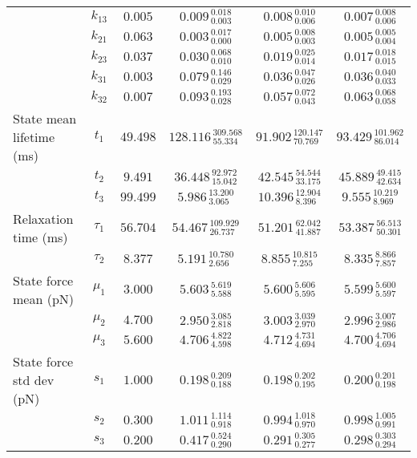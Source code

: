 \begin{table*}
\begin{tabular*}{\textwidth}{@{\extracolsep{\fill}}lccccc}
		& $k_{13}$ & $0.005$ & $0.009_{\:0.003}^{\:0.018}$ & $0.008_{\:0.006}^{\:0.010}$ & $0.007_{\:0.006}^{\:0.008}$ \\
		& $k_{21}$ & $0.063$ & $0.003_{\:0.000}^{\:0.017}$ & $0.005_{\:0.003}^{\:0.008}$ & $0.005_{\:0.004}^{\:0.005}$ \\
		& $k_{23}$ & $0.037$ & $0.030_{\:0.010}^{\:0.068}$ & $0.019_{\:0.014}^{\:0.025}$ & $0.017_{\:0.015}^{\:0.018}$ \\
		& $k_{31}$ & $0.003$ & $0.079_{\:0.029}^{\:0.146}$ & $0.036_{\:0.026}^{\:0.047}$ & $0.036_{\:0.033}^{\:0.040}$ \\
		& $k_{32}$ & $0.007$ & $0.093_{\:0.028}^{\:0.193}$ & $0.057_{\:0.043}^{\:0.072}$ & $0.063_{\:0.058}^{\:0.068}$ \\
		\hline
		State mean lifetime (ms) 		& $t_{1}$ & $49.498$ & $128.116_{\:55.334}^{\:309.568}$ & $91.902_{\:70.769}^{\:120.147}$ & $93.429_{\:86.014}^{\:101.962}$ \\
		& $t_{2}$ & $9.491$ & $36.448_{\:15.042}^{\:92.972}$ & $42.545_{\:33.175}^{\:54.544}$ & $45.889_{\:42.634}^{\:49.415}$ \\
		& $t_{3}$ & $99.499$ & $5.986_{\:3.065}^{\:13.200}$ & $10.396_{\:8.396}^{\:12.904}$ & $9.555_{\:8.969}^{\:10.219}$ \\
		\hline
		Relaxation time (ms) 		& $\tau_{1}$ & $56.704$ & $54.467_{\:26.737}^{\:109.929}$ & $51.201_{\:41.887}^{\:62.042}$ & $53.387_{\:50.301}^{\:56.513}$ \\
		& $\tau_{2}$ & $8.377$ & $5.191_{\:2.656}^{\:10.780}$ & $8.855_{\:7.255}^{\:10.815}$ & $8.335_{\:7.857}^{\:8.866}$ \\
		\hline
		\hline
		State force mean (pN) 		& $\mu_{1}$ & $3.000$ & $5.603_{\:5.588}^{\:5.619}$ & $5.600_{\:5.595}^{\:5.606}$ & $5.599_{\:5.597}^{\:5.600}$ \\
		& $\mu_{2}$ & $4.700$ & $2.950_{\:2.818}^{\:3.085}$ & $3.003_{\:2.970}^{\:3.039}$ & $2.996_{\:2.986}^{\:3.007}$ \\
		& $\mu_{3}$ & $5.600$ & $4.706_{\:4.598}^{\:4.822}$ & $4.712_{\:4.694}^{\:4.731}$ & $4.700_{\:4.694}^{\:4.706}$ \\
		\hline
		State force std dev (pN) 		& $s_{1}$ & $1.000$ & $0.198_{\:0.188}^{\:0.209}$ & $0.198_{\:0.195}^{\:0.202}$ & $0.200_{\:0.198}^{\:0.201}$ \\
		& $s_{2}$ & $0.300$ & $1.011_{\:0.918}^{\:1.114}$ & $0.994_{\:0.970}^{\:1.018}$ & $0.998_{\:0.991}^{\:1.005}$ \\
		& $s_{3}$ & $0.200$ & $0.417_{\:0.290}^{\:0.524}$ & $0.291_{\:0.277}^{\:0.305}$ & $0.298_{\:0.294}^{\:0.303}$ \\
		\hline
\hline
\end{tabular*}
\end{table*}
